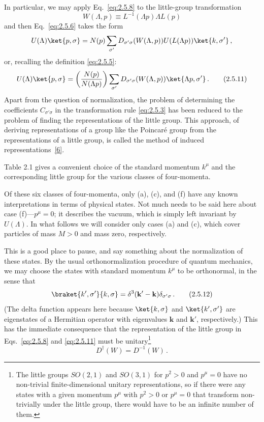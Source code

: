 In particular, we may apply Eq.~\eqref{eq:2.5.8} to the little-group transformation
\begin{equation}
W(\Lambda,p)\equiv L^{-1}(\Lambda p)\Lambda L(p)
\tag{2.5.10}\label{eq:2.5.10}
\end{equation}
and then Eq.~\eqref{eq:2.5.6} takes the form
\[
U(\Lambda)\ket{p,\sigma}
=N(p)\sum_{\sigma'}D_{\sigma'\sigma}(W(\Lambda,p))
U(L(\Lambda p))\ket{k,\sigma'}\,,
\]
or, recalling the definition \eqref{eq:2.5.5}:
\begin{equation}
U(\Lambda)\ket{p,\sigma}
=\left(\frac{N(p)}{N(\Lambda p)}\right)
\sum_{\sigma'}D_{\sigma'\sigma}(W(\Lambda,p))
\ket{\Lambda p,\sigma'}\,.
\tag{2.5.11}\label{eq:2.5.11}
\end{equation}
Apart from the question of normalization, the problem of determining the
coefficients $C_{\sigma'\sigma}$ in the transformation rule \eqref{eq:2.5.3} has been
reduced to the problem of finding the representations of the little group.
This approach, of deriving representations of a group like the
Poincar\'e group from the representations of a little group, is called the method
of induced representations~\hyperref[ref:2.6]{[6]}.

Table 2.1 gives a convenient choice of the standard momentum $k^\mu$ and the
corresponding little group for the various classes of four-momenta.

Of these six classes of four-momenta, only (a), (c), and (f) have any known
interpretations in terms of physical states. Not much needs to be said here
about case (f)---$p^\mu=0$; it describes the vacuum, which is simply left
invariant by $U(\Lambda)$. In what follows we will consider only cases (a) and
(c), which cover particles of mass $M>0$ and mass zero, respectively.

This is a good place to pause, and say something about the normalization of
these states. By the usual orthonormalization procedure of quantum mechanics,
we may choose the states with standard momentum $k^\mu$ to be orthonormal, in
the sense that
\begin{equation}
\braket{k',\sigma'}{k,\sigma}
=\delta^3(\mathbf{k}'-\mathbf{k})\delta_{\sigma'\sigma}\,.
\tag{2.5.12}\label{eq:2.5.12}
\end{equation}
(The delta function appears here because $\ket{k,\sigma}$ and
$\ket{k',\sigma'}$ are eigenstates of a Hermitian operator with eigenvalues
$\mathbf{k}$ and $\mathbf{k}'$, respectively.) This has the immediate
consequence that the representation of the little group in Eqs.~\eqref{eq:2.5.8} and
\eqref{eq:2.5.11} must be unitary\footnote{The little groups $SO(2,1)$ and $SO(3,1)$
for $p^2>0$ and $p^\mu=0$ have no non-trivial finite-dimensional unitary
representations, so if there were any states with a given momentum $p^\mu$
with $p^2>0$ or $p^\mu=0$ that transform non-trivially under the little group,
there would have to be an infinite number of them.}
\begin{equation}
D^\dagger(W)=D^{-1}(W)\,.
\tag{2.5.13}\label{eq:2.5.13}
\end{equation}

